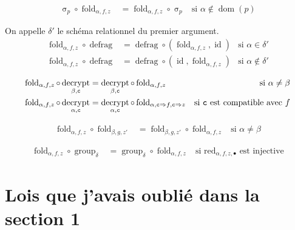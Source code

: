 \documentclass[french]{article}
\DeclareMathOperator{\sel}{\sigma}
\DeclareMathOperator{\defrag}{defrag}
\DeclareMathOperator{\decrypt}{decrypt}
\DeclareMathOperator{\group}{group}
\DeclareMathOperator{\id}{id}
\DeclareMathOperator{\dom}{dom}
\DeclareMathOperator{\redu}{red}
\newcommand\typeT[1]{\text{\ttfamily #1}}
\newcommand{\decryptArgs}[2]{\decrypt_{#1 , \typeT{#2}}}
\newcommand{\selP}{\sel_p}
\newcommand{\decryptCAlpha}{\decryptArgs{\alpha}{c}}
\newcommand{\groupDelta}{\group_{\delta}}
\newcommand{\fold}[3]{\operatorname{fold}_{#1, #2, #3}}
\newcommand{\foldAlphafz}{\fold{\alpha}{f}{z}}
\begin{document}
\begin{align}
\selP \circ \foldAlphafz & = \foldAlphafz \circ \selP
& \text{si $\alpha \notin \dom(p)$}
\end{align}

On appelle $\delta'$ le schéma relationnel du premier argument.
\begin{align}
\foldAlphafz \circ \defrag
& = \defrag \circ (\foldAlphafz, \id)
& \text{si $\alpha \in \delta'$} \\
\foldAlphafz \circ \defrag
& = \defrag \circ (\id, \foldAlphafz)
& \text{si $\alpha \notin \delta'$}
\end{align}

\begin{align}
\foldAlphafz \circ \decryptArgs{\beta}{c}
& = \decryptArgs{\beta}{c} \circ \foldAlphafz
& \text{si $\alpha \neq \beta$} \\
\foldAlphafz \circ \decryptCAlpha
& = \decryptCAlpha \circ \fold{\alpha}{\typeT{c} \Rightarrow f}{\typeT{c} \Rightarrow z}
& \text{si $\typeT{c}$ est compatible avec $f$}
\end{align}

\begin{align}
\foldAlphafz \circ \fold{\beta}{g}{z'}
& = \fold{\beta}{g}{z'} \circ \foldAlphafz
& \text{si $\alpha \neq \beta$}
\end{align}

\begin{align}
\foldAlphafz \circ \groupDelta
& = \groupDelta \circ \foldAlphafz
& \text{si $\redu_{\alpha, f, z, \bullet}$ est injective}
\end{align}

\section*{Lois que j'avais oublié dans la section 1}
\end{document}
